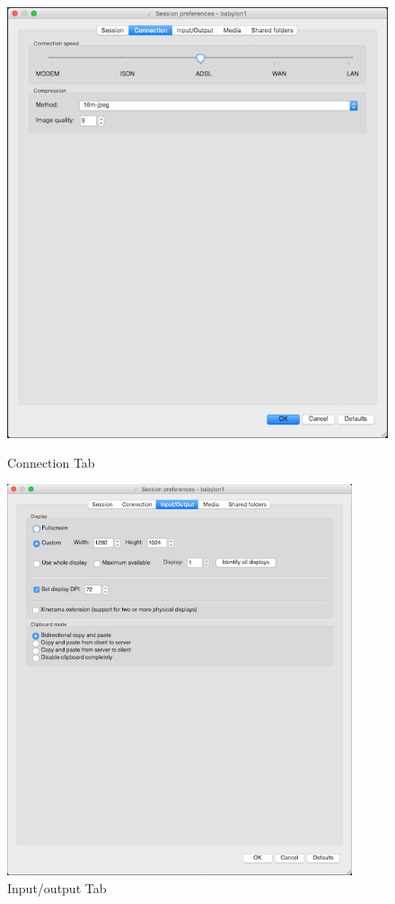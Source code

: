 \begin{figure}
	\centering
	\includegraphics[width=4.66535in,height=5.27165in]{src/images/image2.png}
	\caption{Connection Tab}
	\label{fig:fig2}
\end{figure}
\begin{figure}
	\centering
	\includegraphics[width=4.00394in,height=4.5315in]{src/images/image3.png}
	\caption{Input/output Tab}
	\label{fig:fig3}
\end{figure}
